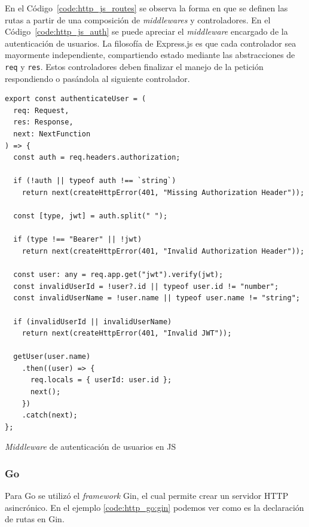 \documentclass[11pt]{article}
\let\Oldsubsubsection\subsubsection
\renewcommand{\subsubsection}{\FloatBarrier\Oldsubsubsection}
\newcommand{\english}[1]{\textit{#1}}
\begin{document}
En el Código~\ref{code:http_js_routes} se observa la forma en que se definen las rutas a partir de una composición de \textit{middlewares} y controladores. En el Código~\ref{code:http_js_auth} se puede apreciar el \english{middleware} encargado de la autenticación de usuarios. La filosofía de Express.js es que cada controlador sea mayormente independiente, compartiendo estado mediante las abstracciones de \lstinline{req} y \lstinline{res}. Estos controladores deben finalizar el manejo de la petición respondiendo o pasándola al siguiente controlador.

\begin{listing}[h]
\begin{verbatim}
export const authenticateUser = (
  req: Request,
  res: Response,
  next: NextFunction
) => {
  const auth = req.headers.authorization;

  if (!auth || typeof auth !== `string`)
    return next(createHttpError(401, "Missing Authorization Header"));

  const [type, jwt] = auth.split(" ");

  if (type !== "Bearer" || !jwt)
    return next(createHttpError(401, "Invalid Authorization Header"));

  const user: any = req.app.get("jwt").verify(jwt);
  const invalidUserId = !user?.id || typeof user.id != "number";
  const invalidUserName = !user.name || typeof user.name != "string";

  if (invalidUserId || invalidUserName)
    return next(createHttpError(401, "Invalid JWT"));

  getUser(user.name)
    .then((user) => {
      req.locals = { userId: user.id };
      next();
    })
    .catch(next);
};
\end{verbatim}
\caption{\english{Middleware} de autenticación de usuarios en JS}
\label{code:http_js_auth}
\end{listing}

\subsubsection{Go}


Para Go se utilizó el \english{framework} Gin\cite{http:go:gin}, el cual permite crear un servidor HTTP asincrónico. En el ejemplo \ref{code:http_go:gin} podemos ver como es la declaración de rutas en Gin.
\end{document}
